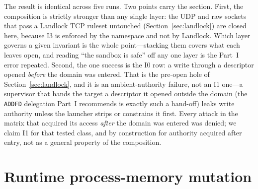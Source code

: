 \documentclass[11pt]{article}
\begin{document}
The result is identical across five runs. Two points carry the section. First, the composition is
strictly stronger than any single layer: the UDP and raw sockets that pass a Landlock TCP ruleset
untouched (Section~\ref{sec:landlock}) are closed here, because I3 is enforced by the namespace and not by
Landlock. Which layer governs a given invariant is the whole point---stacking them covers what each leaves
open, and reading ``the sandbox is safe'' off any one layer is the Part~I error repeated. Second, the one
success is the I0 row: a write through a descriptor opened \emph{before} the domain was entered. That is
the pre-open hole of Section~\ref{sec:landlock}, and it is an ambient-authority failure, not an I1 one---a
supervisor that hands the target a descriptor it opened outside the domain (the \texttt{ADDFD} delegation
Part~I recommends is exactly such a hand-off) leaks write authority unless the launcher strips or
constrains it first. Every attack in the matrix that acquired its access \emph{after} the domain was
entered was denied; we claim I1 for that tested class, and by construction for authority acquired after
entry, not as a general property of the composition.

\section{Runtime process-memory mutation}\label{sec:memmut}
\end{document}
